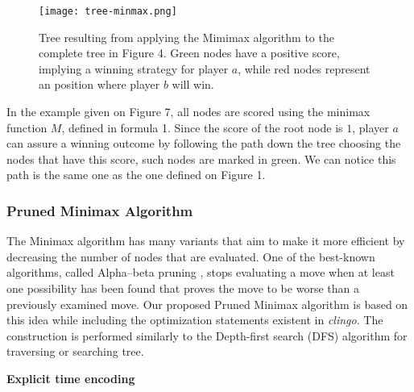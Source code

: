\begin{figure}[H]
  \centering
  \texttt{[image: tree-minmax.png]}
  \caption{Tree resulting from applying the Mimimax algorithm to the complete tree in Figure 4. Green nodes have a positive score, implying a winning strategy for player $a$, while red nodes represent an position where player $b$ will win.}
\end{figure}

In the example given on Figure 7, all nodes are scored using the minimax function $M$, defined in formula 1. Since the score of the root node is $1$, player $a$ can assure a winning outcome by following the path down the tree choosing the nodes that have this score, such nodes are marked in green. We can notice this path is the same one as the one defined on Figure 1.

\subsubsection{Pruned Minimax Algorithm}

The Minimax algorithm has many variants that aim to make it more efficient by decreasing the number of nodes that are evaluated. One of the best-known algorithms, called Alpha–beta pruning \citep{knuth1975analysis}, stops evaluating a move when at least one possibility has been found that proves the move to be worse than a previously examined move. Our proposed Pruned Minimax algorithm is based on this idea while including the optimization statements existent in \textit{clingo}. The construction is performed similarly to the Depth-first search (DFS) algorithm for traversing or searching tree. 

\vspace{10px}
\textbf{Explicit time encoding}\\

